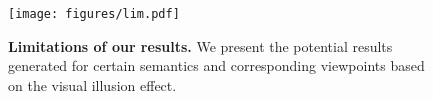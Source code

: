 \begin{figure}[h]
\vspace{-5pt}
    \centering
    \texttt{[image: figures/lim.pdf]}
    \caption{\textbf{Limitations of our results.} We present the potential results generated for certain semantics and corresponding viewpoints based on the visual illusion effect.}
    \label{fig:limitation}
\end{figure}